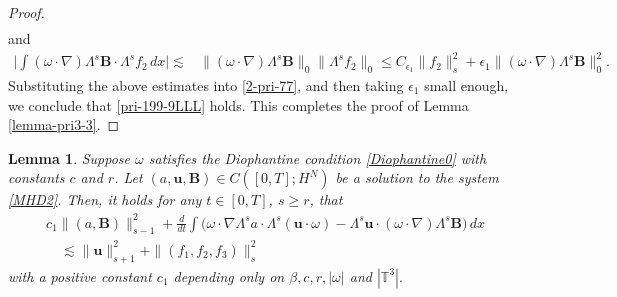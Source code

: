 \documentclass[12pt, reqno]{amsart}
\numberwithin{equation}{section}
\numberwithin{equation}{section}
\numberwithin{equation}{section}
\newtheorem{lemma}[theorem]{Lemma}
\numberwithin{equation}{section}
\theoremstyle{remark}
\def\u{ \mathbf{u} }
\def\b{ \mathbf{B} }
\begin{document}
\begin{proof}
\begin{align*}
\end{align*}
and
\begin{equation*}
\begin{split}
\big|\int(\omega\cdot\nabla)\Lambda^{s}\b\cdot\Lambda^{s} f_2 \,dx\big|\lesssim &\|(\omega\cdot\nabla)\Lambda^{s}\b\|_{0}\|\Lambda^{s}f_2\|_0
\leq C_{\epsilon_1} \|f_2\|_{s}^{2}+\epsilon_1\|(\omega\cdot\nabla)\Lambda^{s}\b\|_{0}^{2}.
\end{split}
\end{equation*}
Substituting the above estimates into \eqref{2-pri-77}, and then taking $\epsilon_1$ small enough, we conclude that \eqref{pri-199-9LLL} holds.
This completes the proof of Lemma \ref{lemma-pri3-3}.
\end{proof}










\begin{lemma}\label{lemma-pri2}Suppose $\omega$ satisfies the Diophantine condition \eqref{Diophantine0}
with constants $c$ and $r$. Let $(a,\u,\b) \in C([0, T];H^N)$ be a solution to the  system \eqref{MHD2}.
Then, it holds for any $t\in[0,T]$, $s\geq r$, that
\begin{equation}
\begin{split}\label{pri-199-9LLLL}
&c_1\|(a,\b)\|_{s-1}^2+\frac{d}{dt}\int \Big(\omega\cdot\nabla\Lambda^{s}a\cdot\Lambda^{s}(\u\cdot\omega)-\Lambda^{s}\u\cdot(\omega\cdot\nabla)\Lambda^{s}\b\Big) \,dx\\
&\quad\lesssim \|\u\|_{s+1}^{2}+\|(f_1,f_2,f_3)\|_{s}^{2}
\end{split}
\end{equation}
with a positive constant $c_1$ depending only on $\beta,c,r,|\omega|$ and $|\mathbb T^3|.$
\end{lemma}
\end{document}
